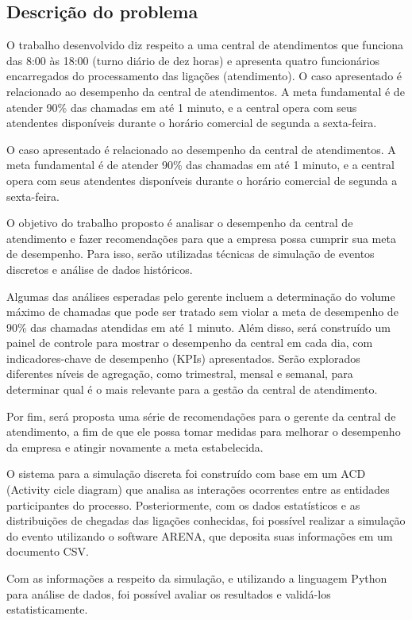 \subsection{Descrição do problema}
\label{section: descricao}
O trabalho desenvolvido diz respeito a uma central de atendimentos que funciona das 8:00 às 18:00 (turno diário de dez horas) e apresenta quatro funcionários encarregados do processamento das ligações (atendimento). O caso apresentado é relacionado ao desempenho da central de atendimentos. A meta fundamental é de atender 90\% das chamadas em até 1 minuto, e a central opera com seus atendentes disponíveis durante o horário comercial de segunda a sexta-feira.

O caso apresentado é relacionado ao desempenho da central de atendimentos. A meta fundamental é de atender 90\% das chamadas em até 1 minuto, e a central opera com seus atendentes disponíveis durante o horário comercial de segunda a sexta-feira.

O objetivo do trabalho proposto é analisar o desempenho da central de atendimento e fazer recomendações para que a empresa possa cumprir sua meta de desempenho. Para isso, serão utilizadas técnicas de simulação de eventos discretos e análise de dados históricos.

Algumas das análises esperadas pelo gerente incluem a determinação do volume máximo de chamadas que pode ser tratado sem violar a meta de desempenho de 90\% das chamadas atendidas em até 1 minuto. Além disso, será construído um painel de controle para mostrar o desempenho da central em cada dia, com indicadores-chave de desempenho (KPIs) apresentados. Serão explorados diferentes níveis de agregação, como trimestral, mensal e semanal, para determinar qual é o mais relevante para a gestão da central de atendimento.

Por fim, será proposta uma série de recomendações para o gerente da central de atendimento, a fim de que ele possa tomar medidas para melhorar o desempenho da empresa e atingir novamente a meta estabelecida.

O sistema para a simulação discreta foi construído com base em um ACD (Activity cicle diagram) que analisa as interações ocorrentes entre as entidades participantes do processo. Posteriormente, com os dados estatísticos e as distribuições de chegadas das ligações conhecidas, foi possível realizar a simulação do evento utilizando o software ARENA, que deposita suas informações em um documento CSV. 

Com as informações a respeito da simulação, e utilizando a linguagem Python para análise de dados, foi possível avaliar os resultados e validá-los estatisticamente.
